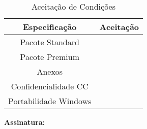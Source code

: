 \documentclass[times, 10pt,twocolumn]{article}
\begin{document}
\begin{table}[ht!]
\caption{Aceita\c{c}\~ao de Condi\c{c}\~oes} %
\centering %
\begin{tabular}{c c} %
\hline\hline %
Especifica\c{c}\~ao & Aceita\c{c}\~ao \\ [0.5ex] %
\hline %
Pacote Standard &  \\[1ex] %
Pacote Premium &  \\[1ex]
Anexos & \\[1ex] 
Confidencialidade CC & \\[1ex] 
Portabilidade Windows & \\[1ex] %
\hline %
\end{tabular}
\label{table:nonlin} %
\end{table}

\textbf{Assinatura:}
\nocite{ex1,ex2}


\end{document}
